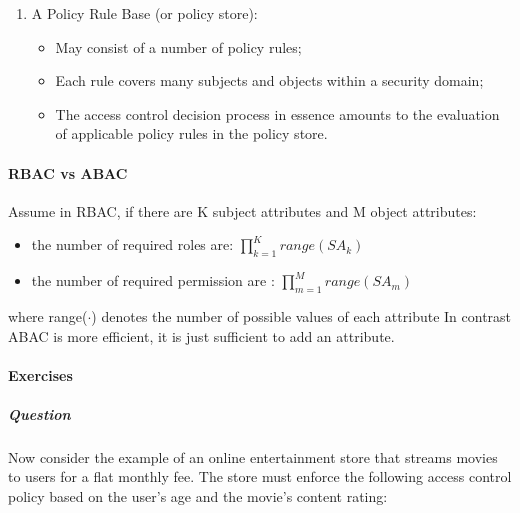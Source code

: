 \documentclass{article}
\begin{document}
\begin{enumerate}
\begin{itemize}
                    \end{itemize}
                \item A Policy Rule Base (or policy store):
                    \begin{itemize}
                        \item May consist of a number of policy rules;
                        \item Each rule covers many subjects and objects within a security domain;
                        \item The access control decision process in essence amounts to the evaluation of applicable policy rules in the policy store.
                    \end{itemize}
            \end{enumerate}
        
        \paragraph{RBAC vs ABAC}

            
        Assume in RBAC, if there are K subject attributes and M
object attributes:

            \begin{itemize}
                \item the number of required roles are: $\prod_{k=1}^{K} range(SA_k)$
                \item the number of required permission are : $\prod_{m=1}^{M} range(SA_m)$
            \end{itemize}

            where range($\cdot$) denotes the number of possible
            values of each attribute
            In contrast ABAC is more efficient, it is just sufficient to
            add an attribute.
            \newpage
            \paragraph{Exercises}
                \subparagraph{Question} 
                Now consider the example of an online
                entertainment store that streams movies to
                users for a flat monthly fee.
                The store must enforce the following access
                control policy based on the user's age and the
                movie's content rating:
\end{document}
